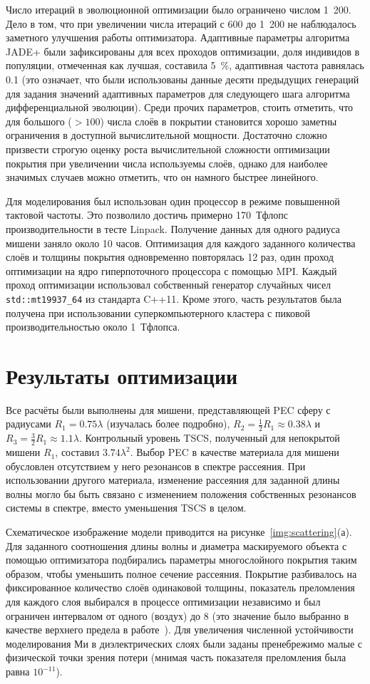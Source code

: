 Число итераций в эволюционной оптимизации было ограничено числом
1~200. Дело в том, что при увеличении числа итераций с 600 до 1~200 не
наблюдалось заметного улучшения работы оптимизатора. Адаптивные
параметры алгоритма JADE+ были зафиксированы для всех проходов
оптимизации, доля индивидов в популяции, отмеченная как лучшая,
составила 5~\%, адаптивная частота равнялась 0.1 (это означает, что
были использованы данные десяти предыдущих генераций для задания
значений адаптивных параметров для следующего шага алгоритма
дифференциальной эволюции).  Среди прочих параметров, стоить отметить,
что для большого ($>100$) числа слоёв в покрытии становится хорошо
заметны ограничения в доступной вычислительной мощности. Достаточно
сложно призвести строгую оценку роста вычислительной сложности
оптимизации покрытия при увеличении числа используемы слоёв, однако
для наиболее значимых случаев можно отметить, что он намного быстрее
линейного.

Для моделирования был использован один процессор в режиме повышенной
тактовой частоты. Это позволило достичь примерно 170~Тфлопс
производительности в тесте Linpack. Получение данных для одного
радиуса мишени заняло около 10 часов. Оптимизация для каждого
заданного количества слоёв и толщины покрытия одновременно повторялась
12 раз, один проход оптимизации на ядро гиперпоточного процессора с
помощью MPI. Каждый проход оптимизации использовал собственный
генератор случайных чисел \verb+std::mt19937_64+ из стандарта
C++11. Кроме этого, часть результатов была получена при использовании
суперкомпьютерного кластера с пиковой производительностью около
1~Тфлопса.

\section{Результаты оптимизации}  
Все расчёты были выполнены для мишени, представляющей PEC сферу с
радиусами ${R_1 = 0.75\lambda}$ (изучалась более подробно),
${R_2 = \frac{1}{2}R_1\approx 0.38\lambda}$ и
${R_3 = \frac{3}{2}R_1 \approx 1.1\lambda}$.  Контрольный уровень
TSCS, полученный для непокрытой мишени ${R_1}$, составил
$3.74\lambda^2$.  Выбор PEC в качестве материала для мишени обусловлен
отсутствием у него резонансов в спектре рассеяния. При использовании
другого материала, изменение рассеяния для заданной длины волны могло
бы быть связано с изменением положения собственных резонансов системы
в спектре, вместо уменьшения TSCS в целом.

Схематическое изображение модели приводится на
рисунке~\ref{img:scattering}(а). Для заданного соотношения длины волны
и диаметра маскируемого объекта с помощью оптимизатора подбирались
параметры многослойного покрытия таким образом, чтобы уменьшить полное
сечение рассеяния.  Покрытие разбивалось на фиксированное количество
слоёв одинаковой толщины, показатель преломления для каждого слоя
выбирался в процессе оптимизации независимо и был ограничен интервалом
от одного (воздух) до $8$ (это значение было выбранно в качестве
верхнего предела в работе~\cite{Semouchkina-2013}).  Для увеличения
численной устойчивости моделирования Ми в диэлектрических слоях были
заданы пренебрежимо малые с физической точки зрения потери (мнимая
часть показателя преломления была равна $10^{-11}$).

